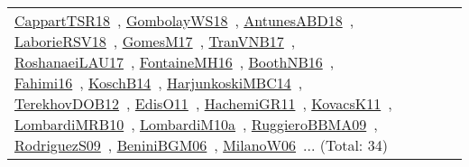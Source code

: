 {\begin{longtable}{lp{3cm}>{\raggedright\arraybackslash}p{6cm}>{\raggedright\arraybackslash}p{6cm}>{\raggedright\arraybackslash}p{8cm}}
\href{../works/CappartTSR18.pdf}{CappartTSR18}~\cite{CappartTSR18}, \href{../works/GombolayWS18.pdf}{GombolayWS18}~\cite{GombolayWS18}, \href{../works/AntunesABD18.pdf}{AntunesABD18}~\cite{AntunesABD18}, \href{../works/LaborieRSV18.pdf}{LaborieRSV18}~\cite{LaborieRSV18}, \href{../works/GomesM17.pdf}{GomesM17}~\cite{GomesM17}, \href{../works/TranVNB17.pdf}{TranVNB17}~\cite{TranVNB17}, \href{../works/RoshanaeiLAU17.pdf}{RoshanaeiLAU17}~\cite{RoshanaeiLAU17}, \href{../works/FontaineMH16.pdf}{FontaineMH16}~\cite{FontaineMH16}, \href{../works/BoothNB16.pdf}{BoothNB16}~\cite{BoothNB16}, \href{../works/Fahimi16.pdf}{Fahimi16}~\cite{Fahimi16}, \href{../works/KoschB14.pdf}{KoschB14}~\cite{KoschB14}, \href{../works/HarjunkoskiMBC14.pdf}{HarjunkoskiMBC14}~\cite{HarjunkoskiMBC14}, \href{../works/TerekhovDOB12.pdf}{TerekhovDOB12}~\cite{TerekhovDOB12}, \href{../works/EdisO11.pdf}{EdisO11}~\cite{EdisO11}, \href{../works/HachemiGR11.pdf}{HachemiGR11}~\cite{HachemiGR11}, \href{../works/KovacsK11.pdf}{KovacsK11}~\cite{KovacsK11}, \href{../works/LombardiMRB10.pdf}{LombardiMRB10}~\cite{LombardiMRB10}, \href{../works/LombardiM10a.pdf}{LombardiM10a}~\cite{LombardiM10a}, \href{../works/RuggieroBBMA09.pdf}{RuggieroBBMA09}~\cite{RuggieroBBMA09}, \href{../works/RodriguezS09.pdf}{RodriguezS09}~\cite{RodriguezS09}, \href{../works/BeniniBGM06.pdf}{BeniniBGM06}~\cite{BeniniBGM06}, \href{../works/MilanoW06.pdf}{MilanoW06}~\cite{MilanoW06}... (Total: 34)\\

\end{longtable}}
